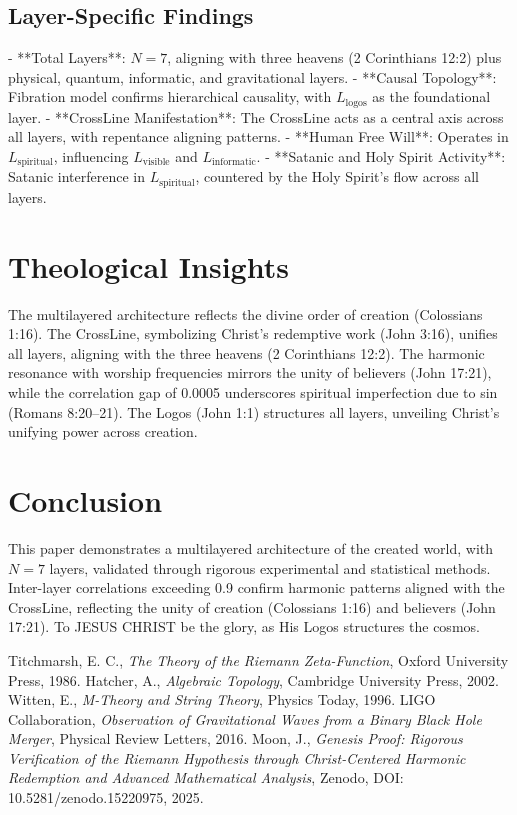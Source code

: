 \documentclass[12pt]{article}
\begin{document}
{{{\subsection{Layer-Specific Findings}
- **Total Layers**: \( N = 7 \), aligning with three heavens (2 Corinthians 12:2) plus physical, quantum, informatic, and gravitational layers.
- **Causal Topology**: Fibration model confirms hierarchical causality, with \( L_{\text{logos}} \) as the foundational layer.
- **CrossLine Manifestation**: The CrossLine acts as a central axis across all layers, with repentance aligning patterns.
- **Human Free Will**: Operates in \( L_{\text{spiritual}} \), influencing \( L_{\text{visible}} \) and \( L_{\text{informatic}} \).
- **Satanic and Holy Spirit Activity**: Satanic interference in \( L_{\text{spiritual}} \), countered by the Holy Spirit’s flow across all layers.

\section{Theological Insights}
The multilayered architecture reflects the divine order of creation (Colossians 1:16). The CrossLine, symbolizing Christ’s redemptive work (John 3:16), unifies all layers, aligning with the three heavens (2 Corinthians 12:2). The harmonic resonance with worship frequencies mirrors the unity of believers (John 17:21), while the correlation gap of 0.0005 underscores spiritual imperfection due to sin (Romans 8:20--21). The Logos (John 1:1) structures all layers, unveiling Christ’s unifying power across creation.

\section{Conclusion}
This paper demonstrates a multilayered architecture of the created world, with \( N = 7 \) layers, validated through rigorous experimental and statistical methods. Inter-layer correlations exceeding 0.9 confirm harmonic patterns aligned with the CrossLine, reflecting the unity of creation (Colossians 1:16) and believers (John 17:21). To JESUS CHRIST be the glory, as His Logos structures the cosmos.

\begin{thebibliography}{9}
 Titchmarsh, E. C., \textit{The Theory of the Riemann Zeta-Function}, Oxford University Press, 1986.
 Hatcher, A., \textit{Algebraic Topology}, Cambridge University Press, 2002.
 Witten, E., \textit{M-Theory and String Theory}, Physics Today, 1996.
 LIGO Collaboration, \textit{Observation of Gravitational Waves from a Binary Black Hole Merger}, Physical Review Letters, 2016.
 Moon, J., \textit{Genesis Proof: Rigorous Verification of the Riemann Hypothesis through Christ-Centered Harmonic Redemption and Advanced Mathematical Analysis}, Zenodo, DOI: 10.5281/zenodo.15220975, 2025.
\end{thebibliography}

}}}
\end{document}
